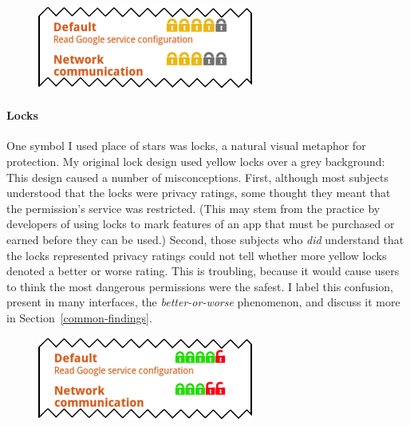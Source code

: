 \documentclass[11pt]{article}
\newcommand{\refsec}[1]{Section~\ref{#1}}
\begin{document}
\begin{figure}
\begin{center}
\includegraphics[width=.9\linewidth]{candidate-img/locks/locksR1.png}
\end{center}
\end{figure}

\paragraph{Locks}
\label{s-sec-locks}

One symbol I used place of stars was locks, a natural visual metaphor for protection.
My original lock design used yellow locks over a grey background:
This design caused a number of
misconceptions.
First, although most subjects understood that the locks were privacy 
ratings, some thought they meant that 
the permission's service was restricted. (This may 
stem from the practice by developers of using locks to mark features of 
an app that must be purchased or earned before they can be used.)
Second, those subjects who \emph{did} understand that the locks represented privacy ratings
could not tell whether more yellow locks denoted a better or worse 
rating. This is troubling, because it would cause users to think the most 
dangerous permissions were the safest. I label this confusion,
present in many interfaces, the 
\emph{better-or-worse} phenomenon, and discuss it more in \refsec{common-findings}.

\begin{figure}
\begin{center}
\includegraphics[width=.9\linewidth]{candidate-img/locks/locksR2.png}
\end{center}
\end{figure}
\end{document}
